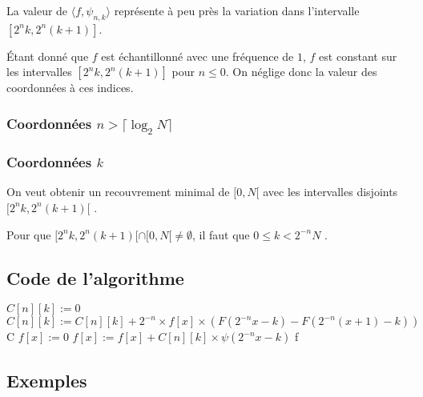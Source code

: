\documentclass[]{article}
\theoremstyle{remark}
\theoremstyle{definition}
\begin{document}
La valeur de $\langle f,\psi_{n,k}\rangle$ représente à peu près la variation dans l'intervalle $[2^{n}k,2^{n}(k+1)]$.

Étant donné que $f$ est échantillonné avec une fréquence de $1$, $f$ est constant sur les intervalles $[2^{n}k,2^{n}(k+1)]$ pour $n\le 0$. On néglige donc la valeur des coordonnées à ces indices.

\subsubsection{Coordonnées $n > \lceil\log_2 N\rceil$}

\subsubsection{Coordonnées $k$}

On veut obtenir un recouvrement minimal de $[0,N[$ avec les intervalles disjoints $[2^{n}k,2^{n}(k+1)[$ .

Pour que $[2^{n}k,2^{n}(k+1)[\cap[0,N[\neq\emptyset$, il faut que $0\le k< 2^{-n}N$ .

\subsection{Code de l'algorithme}
\begin{algorithm}
\begin{algorithmic}[1]
\State $C[n][k] := 0$
\State $C[n][k] := C[n][k] + 2^{-n}\times f[x]\times\left(F(2^{-n}x-k)-F(2^{-n}(x+1)-k)\right)$
\EndFor
\EndFor
\EndFor
\State \Return C
\EndProcedure
\Statex
{}
\State $f[x] := 0$
\State $f[x] := f[x] + C[n][k]\times\psi(2^{-n}x-k)$
\EndFor
\EndFor
\EndFor
\State \Return f
\EndProcedure
\end{algorithmic}
\end{algorithm}



\subsection{Exemples}
\end{document}
